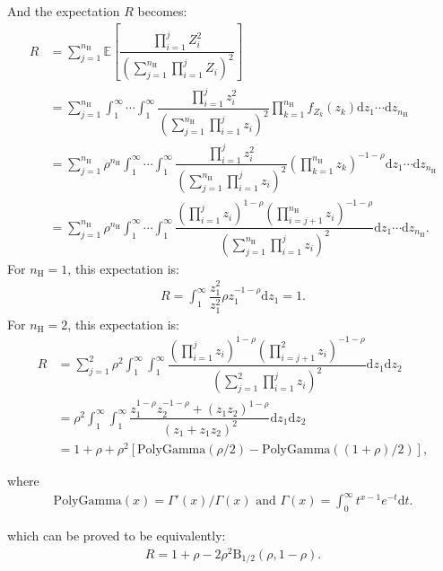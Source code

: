 \documentclass{article}
\newcommand{\ud}{{\mathrm{d}}}
\newcommand{\nN}{{n_\textrm{H}}}
\begin{document}
And the expectation $R$ becomes: 
\begin{align}
R &=  \sum_{j=1}^\nN \mathbb{E} \left[ \dfrac{  \prod_{i=1}^j Z_i^2 }{ \left( \sum_{j=1}^\nN \prod_{i=1}^j Z_i \right)^2 } \right] \\
  &= \displaystyle \sum_{j=1}^\nN \int_1^\infty \cdots \int_1^\infty  \dfrac{   \prod_{i=1}^j z_i^2 }{ \left( \sum_{j=1}^\nN \prod_{i=1}^j z_i \right)^2 } \prod_{k=1}^\nN f_{Z_k}(z_k)  \ud z_1 \cdots \ud z_\nN \\
 &= \displaystyle \sum_{j=1}^\nN \rho^\nN \int_1^\infty \cdots \int_1^\infty  \dfrac{  \prod_{i=1}^j z_i^2 }{ \left( \sum_{j=1}^\nN \prod_{i=1}^j z_i \right)^2 } \left( \prod_{k=1}^\nN z_k \right)^{-1-\rho} \ud z_1 \cdots \ud z_\nN  \\
  &= \displaystyle \sum_{j=1}^\nN \rho^\nN \int_1^\infty \cdots \int_1^\infty  \dfrac{  \left( \prod_{i=1}^j z_i \right)^{1-\rho} \left( \prod_{i=j+1}^\nN z_i \right)^{-1-\rho} }{ \left( \sum_{j=1}^\nN \prod_{i=1}^j z_i \right)^2 }  \ud z_1 \cdots \ud z_\nN .
\end{align}
For $\nN=1$, this expectation is:
\begin{align}
R =\displaystyle  \int_1^\infty  \dfrac{z_1^2 }{ z_1^2 }  \rho z_1^{ -1 - \rho } \ud z_1 = 1.
\end{align}
For $\nN=2$, this expectation is:
\begin{align}
R  &= \displaystyle \sum_{j=1}^2 \rho^2 \int_1^\infty \int_1^\infty  \dfrac{ \left( \prod_{i=1}^j z_i \right)^{1-\rho} \left( \prod_{i=j+1}^2 z_i \right)^{-1-\rho}  }{ \left( \sum_{j=1}^2 \prod_{i=1}^j z_i \right)^2 } \ud z_1 \ud z_2 \\
 &=\displaystyle  \rho^2  \int_1^\infty \int_1^\infty  \dfrac{   z_1^{1-\rho} z_2^{-1-\rho} +(z_1 z_2 )^{1-\rho} }{ \left( z_1 + z_1 z_2  \right)^2 }  \ud z_1 \ud z_2 \\
 &=1 + \rho + \rho^2 [\mathrm{PolyGamma}( \rho /2) - \mathrm{PolyGamma}( (1 + \rho)/2)],
\end{align}

where
\begin{align}
\mathrm{PolyGamma} (x) =\Gamma'(x) / \Gamma(x) \text{ and } \Gamma (x) = \int_0^\infty t^{x-1} e^{-t} \ud t .
\end{align}

which can be proved to be equivalently:
\begin{align}
R  = 1+ \rho - 2 \rho^2 \mathrm{B}_{1/2}(\rho,1-\rho).
\end{align}
\end{document}
